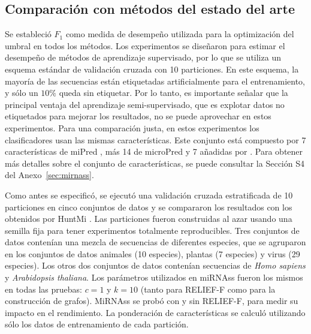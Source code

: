 \subsection*{Comparación con métodos del estado del arte}
Se estableció $ F_{1} $ como medida de desempeño utilizada para la optimización del umbral en todos los métodos. Los experimentos se diseñaron para estimar el
desempeño de métodos de aprendizaje supervisado, por lo que se utiliza un esquema estándar de validación cruzada con 10 particiones. En este esquema, la mayoría
de las secuencias están etiquetadas artificialmente para el entrenamiento, y sólo un $ 10 \% $ queda sin etiquetar. Por lo tanto, es importante señalar que la
principal ventaja del aprendizaje semi-supervisado, que es explotar datos no etiquetados para mejorar los resultados, no se puede aprovechar en estos
experimentos.  Para una comparación justa, en estos experimentos los clasificadores usan las mismas características. Este conjunto está compuesto por 7
características de miPred \citep{ng2007novo}, más 14 de microPred \citep{batuwita2009micropred} y 7 añadidas por \cite{gudys2013huntmi}. Para obtener más
detalles sobre el conjunto de características, se puede consultar la Sección S4 del Anexo~\ref{sec:mirnass}.

Como antes se especificó, se ejecutó una validación cruzada estratificada de 10 particiones en cinco conjuntos de datos y se compararon los resultados con
los obtenidos por HuntMi \citep{gudys2013huntmi}. Las particiones fueron construidas al azar usando una semilla fija para tener experimentos totalmente
reproducibles. Tres conjuntos de datos contenían una mezcla de secuencias de diferentes especies, que se agruparon en los conjuntos de datos animales (10
especies), plantas (7 especies) y virus (29 especies). Los otros dos conjuntos de datos contenían secuencias de \textit{Homo sapiens} y \textit{Arabidopsis
thaliana}. Los parámetros utilizados en miRNAss fueron los mismos en todas las pruebas: $ c = 1 $ y $ k = 10 $ (tanto para RELIEF-F como para la construcción
de grafos). MiRNAss se probó con y sin RELIEF-F, para medir su impacto en el rendimiento. La ponderación de características se calculó utilizando sólo los datos
de entrenamiento de cada partición.


